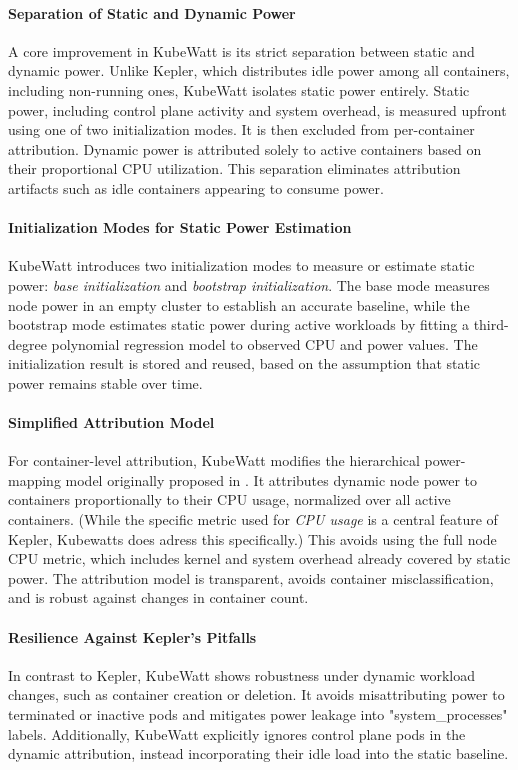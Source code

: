 \paragraph{Separation of Static and Dynamic Power}
A core improvement in KubeWatt is its strict separation between static and dynamic power. Unlike Kepler, which distributes idle power among all containers, including non-running ones, KubeWatt isolates static power entirely. Static power, including control plane activity and system overhead, is measured upfront using one of two initialization modes. It is then excluded from per-container attribution. Dynamic power is attributed solely to active containers based on their proportional CPU utilization. This separation eliminates attribution artifacts such as idle containers appearing to consume power.

\paragraph{Initialization Modes for Static Power Estimation}
KubeWatt introduces two initialization modes to measure or estimate static power: \textit{base initialization} and \textit{bootstrap initialization}. The base mode measures node power in an empty cluster to establish an accurate baseline, while the bootstrap mode estimates static power during active workloads by fitting a third-degree polynomial regression model to observed CPU and power values. The initialization result is stored and reused, based on the assumption that static power remains stable over time.

\paragraph{Simplified Attribution Model}
For container-level attribution, KubeWatt modifies the hierarchical power-mapping model originally proposed in \cite{andringa2024estimating}. It attributes dynamic node power to containers proportionally to their CPU usage, normalized over all active containers. (While the specific metric used for \emph{CPU usage} is a central feature of Kepler, Kubewatts does adress this specifically.) This avoids using the full node CPU metric, which includes kernel and system overhead already covered by static power. The attribution model is transparent, avoids container misclassification, and is robust against changes in container count.

\paragraph{Resilience Against Kepler's Pitfalls}
In contrast to Kepler, KubeWatt shows robustness under dynamic workload changes, such as container creation or deletion. It avoids misattributing power to terminated or inactive pods and mitigates power leakage into "system\_processes" labels. Additionally, KubeWatt explicitly ignores control plane pods in the dynamic attribution, instead incorporating their idle load into the static baseline.

